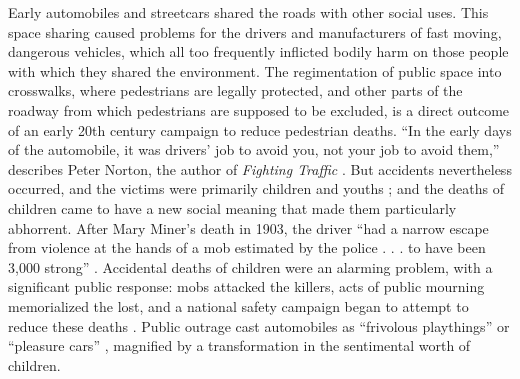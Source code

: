 Early automobiles and streetcars shared the roads with other social
uses. This space sharing caused problems for the drivers and
manufacturers of fast moving, dangerous vehicles, which all too
frequently inflicted bodily harm on those people with which they
shared the environment. The regimentation of public space into
crosswalks, where pedestrians are legally protected, and other parts
of the roadway from which pedestrians are supposed to be excluded, is
a direct outcome of an early 20th century campaign to reduce
pedestrian deaths. ``In the early days of the automobile, it was
drivers' job to avoid you, not your job to avoid them,'' describes
Peter Norton, the author of \emph{Fighting Traffic}
\cite{voxNorton}.
But accidents nevertheless occurred, and the victims were primarily
children and youths \cite[p. 11]{nortonFighting}; and the deaths of
children came to have a new social meaning that made them 
particularly abhorrent.
After Mary Miner's death in 1903, the driver ``had a narrow escape
from violence at the hands of a mob estimated by the police . . . to
have been 3,000 strong'' \cite[p. 22]{zelizer}. Accidental deaths of children were an
alarming problem, with a significant public response:  mobs attacked
the killers, acts of public mourning memorialized the lost, and a
national safety campaign began to attempt to reduce these
deaths \cite[p. 23]{zelizer}. Public outrage cast automobiles as
``frivolous playthings'' or ``pleasure cars'' \cite[p. 12]{nortonFighting}, magnified
by a transformation in the sentimental worth of
children. 

